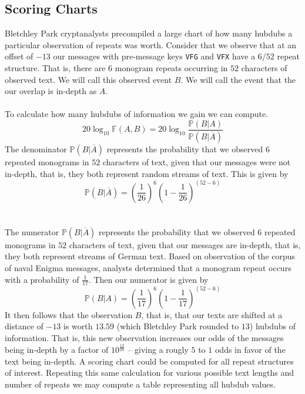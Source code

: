   \subsection{Scoring Charts}
  Bletchley Park cryptanalysts precompiled a large chart of how many
  hubdubs a particular observation of repeats was worth. Consider
  that we observe that at an offset of $-13$ our messages with
  pre-message keys \texttt{VFG} and \texttt{VFX} have a $6/52$ repeat
  structure. That is, there are $6$ monogram repeats occurring in $52$
  characters of observed text. We will call this observed event $B$.
  We will call the event that the our overlap is in-depth as $A$.
  \\\\To calculate how many hubdubs of information we gain we can compute.
  \[
    20\log_{10}\mathbb{F}(A,B) =
    20\log_{10}\frac{\mathbb{P}(B|A)}{\mathbb{P}(B|\overline{A})}
  \]
  The denominator $\mathbb{P}(B|\overline{A})$ represents the
  probability that we observed $6$ repeated monograms in $52$
  characters of text, given that our messages were not in-depth, that
  is, they both represent random streams of text. This is given by
  \[
    \mathbb{P}(B|\overline{A}) = (\frac{1}{26})^6(1-\frac{1}{26})^{(52-6)}
  \]
  \\\\The numerator $\mathbb{P}(B|\overline{A})$ represents the
  probability that we observed $6$ repeated monograms in $52$
  characters of text, given that our messages are in-depth, that is,
  they both represent streams of German text. Based on observation of
  the corpus of naval Enigma messages, analysts determined that a
  monogram repeat occurs with a probability of $\frac{1}{17}$. Then
  our numerator is given by
  \[
    \mathbb{P}(B|A) = (\frac{1}{17})^6(1-\frac{1}{17})^{(52-6)}
  \]
  It then follows that the observation $B$, that is, that our texts
  are shifted at a distance of $-13$ is worth $13.59$ (which
  Bletchley Park rounded to $13$) hubdubs of information. That is,
  this new observation increases our odds of the messages being
  in-depth by a factor of $10^\frac{13}{20}$ -- giving a rougly $5$
  to $1$ odds in favor of the text being in-depth. A scoring chart
  could be computed for all repeat structures of interest. Repeating
  this same calculation for various possible text lengths and number
  of repeats we may compute a table representing all hubdub values.
